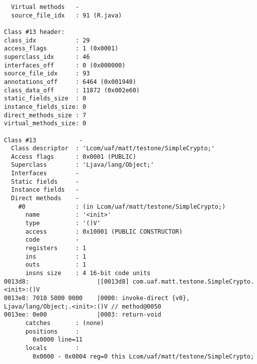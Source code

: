 \begin{lstlisting}
  Virtual methods   -
  source_file_idx   : 91 (R.java)

Class #13 header:
class_idx           : 29
access_flags        : 1 (0x0001)
superclass_idx      : 46
interfaces_off      : 0 (0x000000)
source_file_idx     : 93
annotations_off     : 6464 (0x001940)
class_data_off      : 11872 (0x002e60)
static_fields_size  : 0
instance_fields_size: 0
direct_methods_size : 7
virtual_methods_size: 0

Class #13            -
  Class descriptor  : 'Lcom/uaf/matt/testone/SimpleCrypto;'
  Access flags      : 0x0001 (PUBLIC)
  Superclass        : 'Ljava/lang/Object;'
  Interfaces        -
  Static fields     -
  Instance fields   -
  Direct methods    -
    #0              : (in Lcom/uaf/matt/testone/SimpleCrypto;)
      name          : '<init>'
      type          : '()V'
      access        : 0x10001 (PUBLIC CONSTRUCTOR)
      code          -
      registers     : 1
      ins           : 1
      outs          : 1
      insns size    : 4 16-bit code units
0013d8:                   |[0013d8] com.uaf.matt.testone.SimpleCrypto.<init>:()V
0013e8: 7010 5000 0000    |0000: invoke-direct {v0}, Ljava/lang/Object;.<init>:()V // method@0050
0013ee: 0e00              |0003: return-void
      catches       : (none)
      positions     :
        0x0000 line=11
      locals        :
        0x0000 - 0x0004 reg=0 this Lcom/uaf/matt/testone/SimpleCrypto;


\end{lstlisting}
